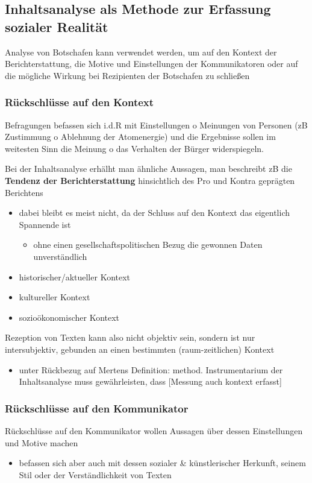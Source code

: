 \documentclass[11pt]{article}
\begin{document}
\subsection{Inhaltsanalyse als Methode zur Erfassung sozialer Realität}
\label{sec:org6d73e5a}
Analyse von Botschafen kann verwendet werden, um auf den Kontext der Berichterstattung, die Motive und Einstellungen der Kommunikatoren oder auf die mögliche Wirkung bei Rezipienten der Botschafen zu schließen
\subsubsection{Rückschlüsse auf den Kontext}
\label{sec:org0c668b4}
Befragungen befassen sich i.d.R mit Einstellungen o Meinungen von Personen (zB Zustimmung o Ablehnung der Atomenergie) und die Ergebnisse sollen im weitesten Sinn die Meinung o das Verhalten der Bürger widerspiegeln.

Bei der Inhaltsanalyse erhälht man ähnliche Aussagen, man beschreibt zB die \textbf{Tendenz der Berichterstattung} hinsichtlich des Pro und Kontra geprägten Berichtens
\begin{itemize}
\item dabei bleibt es meist nicht, da der Schluss auf den Kontext das eigentlich Spannende ist
\begin{itemize}
\item ohne einen gesellschaftspolitischen Bezug die gewonnen Daten unverständlich
\end{itemize}
\item historischer/aktueller Kontext
\item kultureller Kontext
\item sozioökonomischer Kontext
\end{itemize}

Rezeption von Texten kann also nicht objektiv sein, sondern ist nur intersubjektiv, gebunden an einen bestimmten (raum-zeitlichen) Kontext
\begin{itemize}
\item unter Rückbezug auf Mertens Definition: method. Instrumentarium der Inhaltsanalyse muss gewährleisten, dass [Messung auch kontext erfasst]
\end{itemize}
\subsubsection{Rückschlüsse auf den Kommunikator}
\label{sec:org4c85782}
Rückschlüsse auf den Kommunikator wollen Aussagen über dessen Einstellungen und Motive machen
\begin{itemize}
\item befassen sich aber auch mit dessen sozialer \& künstlerischer Herkunft, seinem Stil oder der Verständlichkeit von Texten
\end{itemize}
\end{document}
